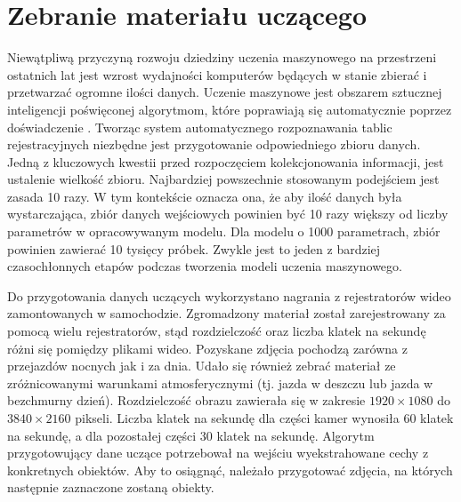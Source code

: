 %



\chapter{Zebranie materiału uczącego}\label{ch:preparing_data_set}

Niewątpliwą przyczyną rozwoju dziedziny uczenia maszynowego na przestrzeni ostatnich lat jest wzrost wydajności komputerów będących w stanie zbierać i przetwarzać ogromne ilości danych.
Uczenie maszynowe jest obszarem sztucznej inteligencji poświęconej algorytmom, które poprawiają się automatycznie poprzez doświadczenie \cite{Mitchell97}.
Tworząc system automatycznego rozpoznawania tablic rejestracyjnych niezbędne jest przygotowanie odpowiedniego zbioru danych.
Jedną z kluczowych kwestii przed rozpoczęciem kolekcjonowania informacji, jest ustalenie wielkość zbioru.
Najbardziej powszechnie stosowanym podejściem jest zasada 10 razy.
W tym kontekście oznacza ona, że aby ilość danych była wystarczająca, zbiór danych wejściowych powinien być 10 razy większy od liczby parametrów w opracowywanym modelu.
Dla modelu o 1000 parametrach, zbiór powinien zawierać 10 tysięcy próbek.
Zwykle jest to jeden z bardziej czasochłonnych etapów podczas tworzenia modeli uczenia maszynowego.

Do przygotowania danych uczących wykorzystano nagrania z rejestratorów wideo zamontowanych w samochodzie.
Zgromadzony materiał został zarejestrowany za pomocą wielu rejestratorów, stąd rozdzielczość oraz liczba klatek na sekundę różni się pomiędzy plikami wideo.
Pozyskane zdjęcia pochodzą zarówna z przejazdów nocnych jak i za dnia.
Udało się również zebrać materiał ze zróżnicowanymi warunkami atmosferycznymi (tj. jazda w deszczu lub jazda w bezchmurny dzień).
Rozdzielczość obrazu zawierała się w zakresie $1920\times 1080$ do $3840\times 2160$ pikseli.
Liczba klatek na sekundę dla części kamer wynosiła 60 klatek na sekundę, a dla pozostałej części 30 klatek na sekundę.
Algorytm przygotowujący dane uczące potrzebował na wejściu wyekstrahowane cechy z konkretnych obiektów.
Aby to osiągnąć, należało przygotować zdjęcia, na których następnie zaznaczone zostaną obiekty.

